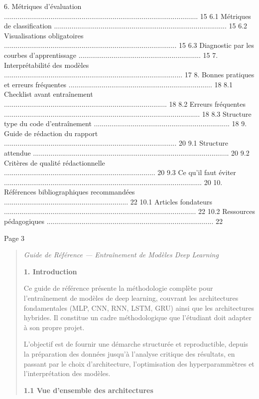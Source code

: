 \documentclass[
]{article}
\begin{document}
6. Métriques d'évaluation
....................................................................................................
15 6.1 Métriques de classification
.........................................................................................
15 6.2 Visualisations obligatoires
.........................................................................................
15 6.3 Diagnostic par les courbes d'apprentissage
............................................................... 15 7.
Interprétabilité des modèles
............................................................................................
17 8. Bonnes pratiques et erreurs fréquentes
..........................................................................
18 8.1 Checklist avant entraînement
....................................................................................
18 8.2 Erreurs fréquentes
.....................................................................................................
18 8.3 Structure type du code d'entraînement
......................................................................
18 9. Guide de rédaction du rapport
.........................................................................................
20 9.1 Structure attendue
.....................................................................................................
20 9.2 Critères de qualité rédactionnelle
..............................................................................
20 9.3 Ce qu'il faut éviter
......................................................................................................
20 10. Références bibliographiques recommandées
................................................................ 22 10.1
Articles fondateurs
...................................................................................................
22 10.2 Ressources pédagogiques
......................................................................................
22

Page 3

\begin{quote}
\emph{Guide de Référence --- Entraînement de Modèles Deep Learning}

\textbf{1. Introduction}

Ce guide de référence présente la méthodologie complète pour
l'entraînement de modèles de deep learning, couvrant les architectures
fondamentales (MLP, CNN, RNN, LSTM, GRU) ainsi que les architectures
hybrides. Il constitue un cadre méthodologique que l'étudiant doit
adapter à son propre projet.

L'objectif est de fournir une démarche structurée et reproductible,
depuis la préparation des données jusqu'à l'analyse critique des
résultats, en passant par le choix d'architecture, l'optimisation des
hyperparammètres et l'interprétation des modèles.

\textbf{1.1 Vue d'ensemble des architectures}
\end{quote}
\end{document}
